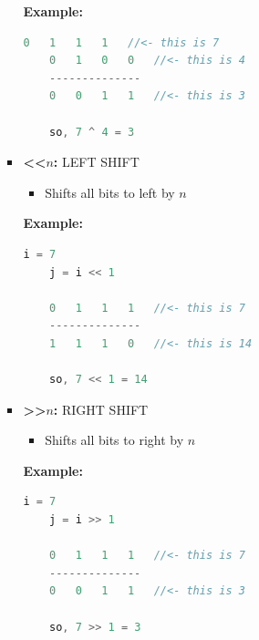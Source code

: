 \documentclass[12pt]{article}
\begin{document}
\begin{itemize}
\begin{itemize}
\begin{itemize}
            \bigskip

            \textbf{Example:}

            \bigskip

    \begin{lstlisting}[language=c]
    0   1   1   1   //<- this is 7
    0   1   0   0   //<- this is 4
    --------------
    0   0   1   1   //<- this is 3

    so, 7 ^ 4 = 3
    \end{lstlisting}

            \item \textbf{\textless\textless $n$:} LEFT SHIFT

            \begin{itemize}
                \item Shifts all bits to left by $n$
            \end{itemize}

            \bigskip

            \textbf{Example:}

            \bigskip

    \begin{lstlisting}[language=c]
    i = 7
    j = i << 1

    0   1   1   1   //<- this is 7
    --------------
    1   1   1   0   //<- this is 14

    so, 7 << 1 = 14
    \end{lstlisting}

            \item \textbf{\textgreater\textgreater $n$:} RIGHT SHIFT
            \begin{itemize}
                \item Shifts all bits to right by $n$
            \end{itemize}

            \bigskip

            \textbf{Example:}

            \bigskip

    \begin{lstlisting}[language=c]
    i = 7
    j = i >> 1

    0   1   1   1   //<- this is 7
    --------------
    0   0   1   1   //<- this is 3

    so, 7 >> 1 = 3
    \end{lstlisting}
        \end{itemize}
    \end{itemize}
\end{itemize}
\end{document}
